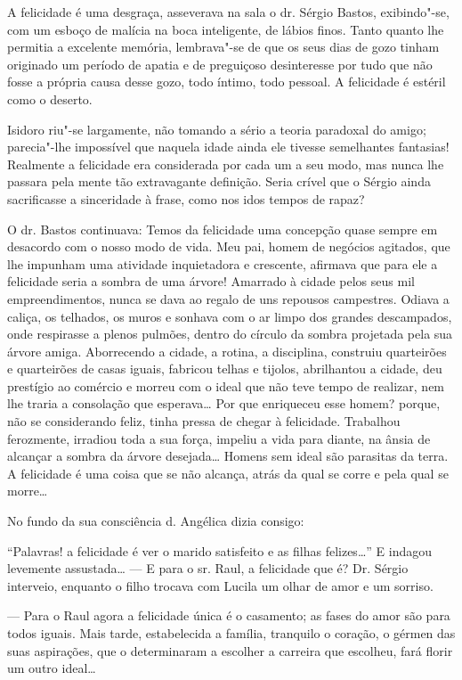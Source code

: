 A felicidade é uma desgraça, asseverava na sala o dr. Sérgio Bastos,
exibindo"-se, com um esboço de malícia na boca inteligente, de lábios
finos. Tanto quanto lhe permitia a excelente memória, lembrava"-se de que
os seus dias de gozo tinham originado um período de apatia e de
preguiçoso desinteresse por tudo que não fosse a própria causa desse
gozo, todo íntimo, todo pessoal. A felicidade é estéril como o deserto.

Isidoro riu"-se largamente, não tomando a sério a teoria paradoxal do
amigo; parecia"-lhe impossível que naquela idade ainda ele tivesse
semelhantes fantasias! Realmente a felicidade era considerada por cada
um a seu modo, mas nunca lhe passara pela mente tão extravagante
definição. Seria crível que o Sérgio ainda sacrificasse a sinceridade à
frase, como nos idos tempos de rapaz?

O dr. Bastos continuava: Temos da felicidade uma concepção quase sempre
em desacordo com o nosso modo de vida. Meu pai, homem de negócios
agitados, que lhe impunham uma atividade inquietadora e crescente,
afirmava que para ele a felicidade seria a sombra de uma árvore!
Amarrado à cidade pelos seus mil empreendimentos, nunca se dava ao
regalo de uns repousos campestres. Odiava a caliça, os telhados, os
muros e sonhava com o ar limpo dos grandes descampados, onde respirasse
a plenos pulmões, dentro do círculo da sombra projetada pela sua árvore
amiga. Aborrecendo a cidade, a rotina, a disciplina, construiu
quarteirões e quarteirões de casas iguais, fabricou telhas e tijolos,
abrilhantou a cidade, deu prestígio ao comércio e morreu com o ideal que
não teve tempo de realizar, nem lhe traria a consolação que esperava\ldots{}
Por que enriqueceu esse homem? porque, não se considerando feliz, tinha
pressa de chegar à felicidade. Trabalhou ferozmente, irradiou toda a sua
força, impeliu a vida para diante, na ânsia de alcançar a sombra da
árvore desejada\ldots{} Homens sem ideal são parasitas da terra. A felicidade
é uma coisa que se não alcança, atrás da qual se corre e pela qual se
morre\ldots{}

No fundo da sua consciência d. Angélica dizia consigo:

``Palavras! a felicidade é ver o marido satisfeito e as filhas
felizes\ldots{}'' E indagou levemente assustada\ldots{} --- E para o sr. Raul, a
felicidade que é? Dr. Sérgio interveio, enquanto o filho trocava com
Lucila um olhar de amor e um sorriso.

--- Para o Raul agora a felicidade única é o casamento; as fases do amor
são para todos iguais. Mais tarde, estabelecida a família, tranquilo o
coração, o gérmen das suas aspirações, que o determinaram a escolher a
carreira que escolheu, fará florir um outro ideal\ldots{}

